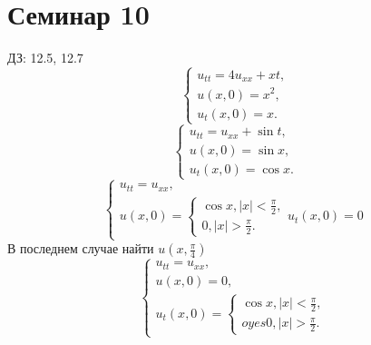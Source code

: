 \documentclass[11pt]{article}
\def\zall{\setcounter{lem}{0}\setcounter{cnsqnc}{0}\setcounter{th}{0}\setcounter{Cmt}{0}\setcounter{equation}{0}}
\newcounter{lem}\setcounter{lem}{0}
\newcounter{th}\setcounter{th}{0}
\newcounter{cnsqnc}\setcounter{cnsqnc}{0}
\newcounter{Cmt}\setcounter{Cmt}{0}
\begin{document}
\section{Семинар 10}
\label{sec:org33f42b8}
\zall
ДЗ: 12.5, 12.7
\begin{equation}
\begin{cases}
u_{tt} = 4u_{xx} + xt, \\
u(x, 0) = x^2, \\
u_t(x, 0) = x.
\end{cases}
\end{equation}
\begin{equation}
\begin{cases}
u_{tt} = u_{xx} + \sin t, \\
u(x, 0) = \sin x, \\
u_t(x, 0) = \cos x.
\end{cases}
\end{equation}
\begin{equation}
\begin{cases}
u_{tt} = u_{xx}, \\
u(x, 0) = \begin{cases}
\cos x, |x| < \frac{\pi}2, \\
0, |x| > \frac{\pi}2.
\end{cases}
u_t(x, 0) = 0
\end{cases}
\end{equation}
В последнем случае найти $u\left(x, \frac{\pi}4\right)$
\begin{equation}
\begin{cases}
u_{tt} = u_{xx}, \\
u(x, 0) = 0, \\
u_t(x, 0) = \begin{cases}
\cos x, |x| < \frac{\pi}2, \\
oyes0, |x| > \frac{\pi}2.
\end{cases}
\end{cases}
\end{equation}
\end{document}
